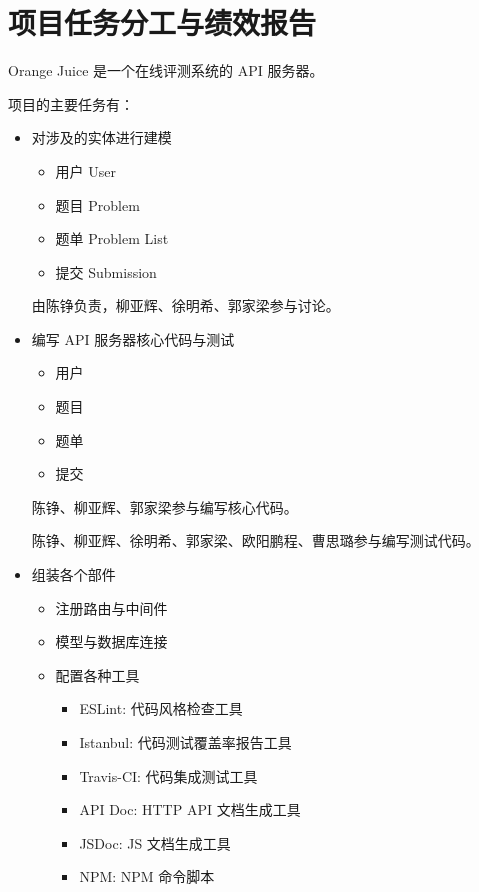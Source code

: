 \chapter{项目任务分工与绩效报告}

Orange Juice 是一个在线评测系统的 API 服务器。

项目的主要任务有：

\begin{itemize}
    \item 对涉及的实体进行建模
    
    \begin{itemize}
        \item 用户 User
        \item 题目 Problem
        \item 题单 Problem List
        \item 提交 Submission
    \end{itemize}
    
    由陈铮负责，柳亚辉、徐明希、郭家梁参与讨论。
    
    \item 编写 API 服务器核心代码与测试
    
    \begin{itemize}
        \item 用户
        \item 题目
        \item 题单
        \item 提交
    \end{itemize}
    
    陈铮、柳亚辉、郭家梁参与编写核心代码。
    
    陈铮、柳亚辉、徐明希、郭家梁、欧阳鹏程、曹思璐参与编写测试代码。
    
    \item 组装各个部件
    
    \begin{itemize}
        \item 注册路由与中间件
        \item 模型与数据库连接
        \item 配置各种工具
        
        \begin{itemize}
            \item ESLint: 代码风格检查工具
            \item Istanbul: 代码测试覆盖率报告工具
            \item Travis-CI: 代码集成测试工具
            \item API Doc: HTTP API 文档生成工具
            \item JSDoc: JS 文档生成工具
            \item NPM: NPM 命令脚本
        \end{itemize}
    \end{itemize}
    

\end{itemize}
